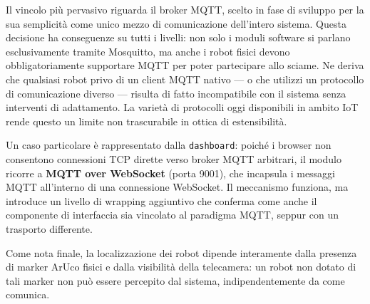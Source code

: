 Il vincolo più pervasivo riguarda il broker \ac{MQTT}, scelto in fase di sviluppo
per la sua semplicità come unico mezzo di comunicazione dell'intero sistema.
Questa decisione ha conseguenze su tutti i livelli: non solo i moduli software
si parlano esclusivamente tramite Mosquitto, ma anche i robot fisici devono
obbligatoriamente supportare \ac{MQTT} per poter partecipare allo sciame. Ne deriva
che qualsiasi robot privo di un client \ac{MQTT} nativo --- o che utilizzi un
protocollo di comunicazione diverso --- risulta di fatto incompatibile con il sistema senza interventi di
adattamento. La varietà di protocolli oggi disponibili in ambito IoT rende
questo un limite non trascurabile in ottica di estensibilità.

Un caso particolare è rappresentato dalla \texttt{dashboard}: poiché i browser
non consentono connessioni TCP dirette verso broker \ac{MQTT} arbitrari, il modulo
ricorre a \textbf{MQTT over WebSocket} (porta 9001), che incapsula i messaggi
\ac{MQTT} all'interno di una connessione WebSocket. Il meccanismo funziona, ma
introduce un livello di wrapping aggiuntivo che conferma come anche il
componente di interfaccia sia vincolato al paradigma \ac{MQTT}, seppur con un
trasporto differente.

Come nota finale, la localizzazione dei robot dipende interamente dalla presenza di
marker ArUco fisici e dalla visibilità della telecamera: un robot non dotato di
tali marker non può essere percepito dal sistema, indipendentemente da come
comunica.